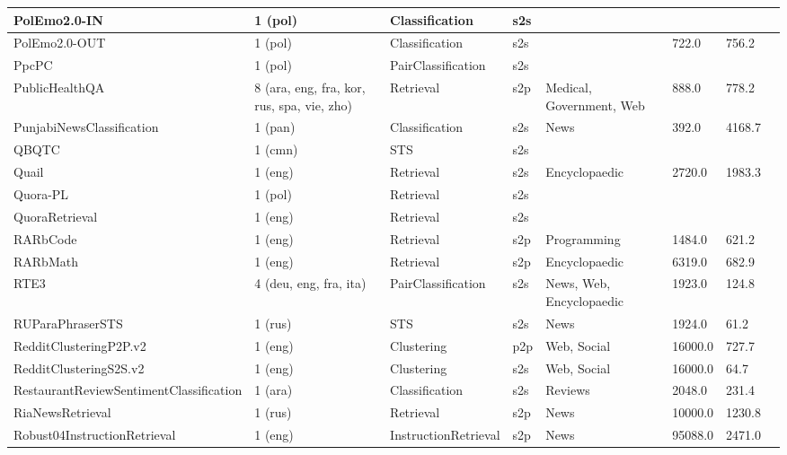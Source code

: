 \begin{longtable}{L{5.0cm}|L{1.5cm}L{1.4cm}L{1.4cm}L{1.4cm}L{1.4cm}L{1.0cm}L{1.0cm}}
 \hline 
PolEmo2.0-IN \cite{kocon-etal-2019-multi} & 1 (pol) & Classification & s2s &  &  &  \\
 \hline 
PolEmo2.0-OUT  & 1 (pol) & Classification & s2s &  & 722.0 & 756.2 \\
 \hline 
PpcPC \cite{dadas2022training} & 1 (pol) & PairClassification & s2s &  &  &  \\
 \hline 
PublicHealthQA \cite{xing_han_lu_2024} & 8 (ara, eng, fra, kor, rus, spa, vie, zho) & Retrieval & s2p & Medical, Government, Web & 888.0 & 778.2 \\
 \hline 
PunjabiNewsClassification \cite{kunchukuttan2020indicnlpcorpus} & 1 (pan) & Classification & s2s & News & 392.0 & 4168.7 \\
 \hline 
QBQTC  & 1 (cmn) & STS & s2s &  &  &  \\
 \hline 
Quail \cite{xiao2024rar} & 1 (eng) & Retrieval & s2s & Encyclopaedic & 2720.0 & 1983.3 \\
 \hline 
Quora-PL \cite{wojtasik2024beirpl} & 1 (pol) & Retrieval & s2s &  &  &  \\
 \hline 
QuoraRetrieval \cite{quora-question-pairs} & 1 (eng) & Retrieval & s2s &  &  &  \\
 \hline 
RARbCode \cite{xiao2024rar} & 1 (eng) & Retrieval & s2p & Programming & 1484.0 & 621.2 \\
 \hline 
RARbMath \cite{xiao2024rar} & 1 (eng) & Retrieval & s2p & Encyclopaedic & 6319.0 & 682.9 \\
 \hline 
RTE3 \cite{giampiccolo-etal-2007-third} & 4 (deu, eng, fra, ita) & PairClassification & s2s & News, Web, Encyclopaedic & 1923.0 & 124.8 \\
 \hline 
RUParaPhraserSTS \cite{gudkov-etal-2020-automatically} & 1 (rus) & STS & s2s & News & 1924.0 & 61.2 \\
 \hline 
RedditClusteringP2P.v2 \cite{geigle:2021:arxiv} & 1 (eng) & Clustering & p2p & Web, Social & 16000.0 & 727.7 \\
 \hline 
RedditClusteringS2S.v2 \cite{geigle:2021:arxiv} & 1 (eng) & Clustering & s2s & Web, Social & 16000.0 & 64.7 \\
 \hline 
RestaurantReviewSentimentClassification \cite{elsahar2015building} & 1 (ara) & Classification & s2s & Reviews & 2048.0 & 231.4 \\
 \hline 
RiaNewsRetrieval \cite{gavrilov2018self} & 1 (rus) & Retrieval & s2p & News & 10000.0 & 1230.8 \\
 \hline 
Robust04InstructionRetrieval \cite{weller2024followir} & 1 (eng) & InstructionRetrieval & s2p & News & 95088.0 & 2471.0 \\

\end{longtable}
